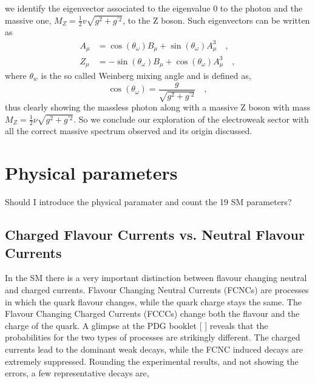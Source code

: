 %
we identify the eigenvector associated to the eigenvalue 0 to the photon and the massive one, $ M_Z =  \frac{1}{2} v \sqrt{g^2 + g^{\prime 2}} $, to the Z boson. Such eigenvectors can be written as
%
\begin{align}
A_\mu &=\cos(\theta_\omega) B_\mu + \sin(\theta_\omega) A_\mu^3 \quad ,  \\  
Z_\mu & =- \sin(\theta_\omega) B_\mu + \cos(\theta_\omega) A_\mu^3 \quad , 
\end{align}
%
where $\theta_w$ is the so called Weinberg mixing angle and is defined as, 
\begin{equation}
\cos(\theta_\omega)=\frac{g}{ \sqrt{g^2 + g^{\prime 2}}} \quad ,  
\end{equation}
%
thus clearly showing the massless photon along with a massive Z boson with mass $M_Z= \frac{1}{2} \nu \sqrt{g^2 + g^{\prime 2}} $. 
%
So we conclude our exploration of the electroweak sector with all the correct massive spectrum observed and its origin discussed.

 

{\color{gray} \section{Physical parameters}
Should I introduce the physical paramater and count the 19 SM parameters? }


\subsection{Charged Flavour Currents vs. Neutral Flavour Currents}

In the SM there is a very important distinction between flavour changing neutral and charged currents. Flavour Changing Neutral Currents (FCNCs) are processes in which the quark flavour changes, while the quark charge stays the same. The Flavour Changing Charged Currents (FCCCs) change both the flavour and the charge of the quark. A glimpse at the PDG booklet [
] reveals that the probabilities for the two types of processes are strikingly different.  The charged currents lead to the dominant weak decays, while the FCNC induced decays are extremely suppressed. Rounding the experimental results, and not showing the errors, a few representative decays are, 


